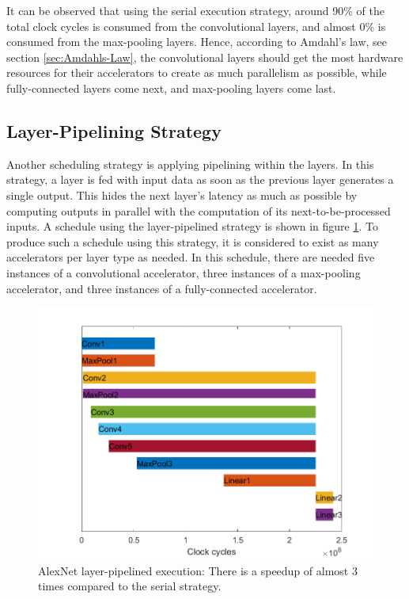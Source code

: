It can be observed that using the serial execution strategy, around 90\% of the total clock cycles is consumed from the convolutional layers, and almost 0\% is consumed from the max-pooling layers. Hence, according to Amdahl's law, see section \ref{sec:Amdahls-Law}, the convolutional layers should get the most hardware resources for their accelerators to create as much parallelism as possible, while fully-connected layers come next, and max-pooling layers come last.

\subsection{Layer-Pipelining Strategy}
Another scheduling strategy is applying pipelining within the layers. In this strategy, a layer is fed with input data as soon as the previous layer generates a single output. This hides the next layer's latency as much as possible by computing outputs in parallel with the computation of its next-to-be-processed inputs. A schedule using the layer-pipelined strategy is shown in figure \ref{fig:layer-pipelined-execution}. To produce such a schedule using this strategy, it is considered to exist as many accelerators per layer type as needed. In this schedule, there are needed five instances of a convolutional accelerator,  three instances of a max-pooling accelerator, and three instances of a fully-connected accelerator.

\begin{figure} [H]
	\centering
	\includegraphics[width=\textwidth]{Images/Scheduling/Pipelined-1x.png}
	\decoRule
	\caption[AlexNet layer-pipelined execution]{AlexNet layer-pipelined execution: There is a speedup of almost 3 times compared to the serial strategy.}
	\label{fig:layer-pipelined-execution}
\end{figure}

